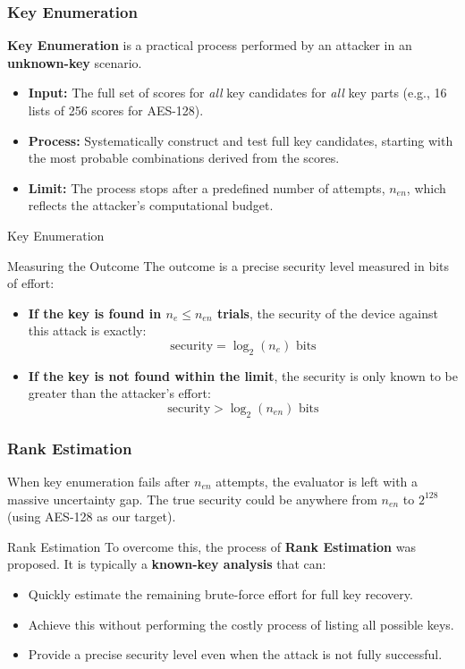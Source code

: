 \begin{frame}
    \frametitle{Key Enumeration}

    \textbf{Key Enumeration} is a practical process performed by an attacker in an \textbf{unknown-key} scenario.
    
    \begin{itemize}
        \item \textbf{Input:} The full set of scores for \textit{all} key candidates for \textit{all} key parts (e.g., 16 lists of 256 scores for AES-128).
        \item \textbf{Process:} Systematically construct and test full key candidates, starting with the most probable combinations derived from the scores.
        \item \textbf{Limit:} The process stops after a predefined number of attempts, $n_{en}$, which reflects the attacker's computational budget.
    \end{itemize}
\end{frame}
\begin{frame} {Key Enumeration}
    \begin{alertblock}{Measuring the Outcome}
        The outcome is a precise security level measured in bits of effort:
        \begin{itemize}
            \item \textbf{If the key is found in $n_e \le n_{en}$ trials}, the security of the device against this attack is exactly:
            $$ \text{security} = \log_2(n_e) \text{ bits} $$
            
            \item \textbf{If the key is not found within the limit}, the security is only known to be greater than the attacker's effort:
            $$ \text{security} > \log_2(n_{en}) \text{ bits} $$
        \end{itemize}
    \end{alertblock}
\end{frame}


\begin{frame}
    \frametitle{Rank Estimation}

    When key enumeration fails after $n_{en}$ attempts, the evaluator is left with a massive uncertainty gap. The true security could be anywhere from $n_{en}$ to $2^{128}$ (using AES-128 as our target).
    
    \begin{block}{Rank Estimation}
        To overcome this, the process of \textbf{Rank Estimation} was proposed. It is typically a \textbf{known-key analysis} that can:
        \begin{itemize}
            \item Quickly estimate the remaining brute-force effort for full key recovery.
            \item Achieve this without performing the costly process of listing all possible keys.
            \item Provide a precise security level even when the attack is not fully successful.
        \end{itemize}
    \end{block}

\end{frame}

